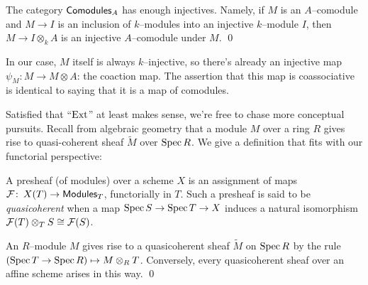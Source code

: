 \begin{corollary}
The category $\mathsf{Comodules}_A$ has enough injectives.  Namely, if $M$ is an $A$--comodule and $M \to I$ is an inclusion of $k$--modules into an injective $k$--module $I$, then $M \to I \otimes_k A$ is an injective $A$--comodule under $M$. \qed
\end{corollary}
\begin{remark}
In our case, $M$ itself is always $k$--injective, so there's already an injective map $\psi_M: M \to M \otimes A$: the coaction map.  The assertion that this map is coassociative is identical to saying that it is a map of comodules.
\end{remark}

Satisfied that ``$\operatorname{Ext}$'' at least makes sense, we're free to chase more conceptual pursuits.  Recall from algebraic geometry that a module $M$ over a ring $R$ gives rise to quasi-coherent sheaf $\widetilde{M}$ over $\operatorname{Spec} R$.  We give a definition that fits with our functorial perspective:
\begin{definition}
A presheaf (of modules) over a scheme $X$ is an assignment of maps $\mathcal{F}\colon\thinspace X(T) \to \mathsf{Modules}_T$, functorially in $T$.   Such a presheaf is said to be \textit{quasicoherent} when a map $\operatorname{Spec} S \to \operatorname{Spec} T \to X$ induces a natural isomorphism $\mathcal{F}(T) \otimes_T S \cong \mathcal{F}(S)$.
\end{definition}

\begin{lemma}
An $R$--module $M$ gives rise to a quasicoherent sheaf $\widetilde M$ on $\operatorname{Spec} R$ by the rule $(\operatorname{Spec} T \to \operatorname{Spec} R) \mapsto M \otimes_R T$.  Conversely, every quasicoherent sheaf over an affine scheme arises in this way.  \qed
\end{lemma}

